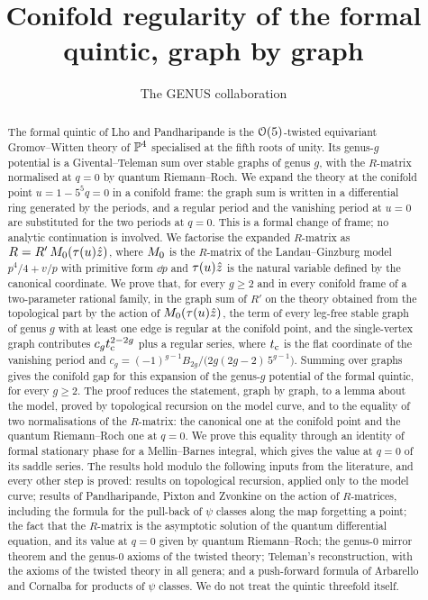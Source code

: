 \documentclass[11pt, reqno]{amsart}
\title[The formal quintic at the conifold point]{Conifold regularity of the formal quintic, graph by graph\protect\draftnote{Working title; to be settled by the authors.}}
\author{The GENUS collaboration}
\begin{document}
\begin{abstract}
The formal quintic of Lho and Pandharipande is the $\mathcal{O}(5)$-twisted equivariant Gromov--Witten theory of $\mathbb{P}^4$ specialised at the fifth roots of unity. Its genus-$g$ potential is a Givental--Teleman sum over stable graphs of genus $g$, with the $R$-matrix normalised at $q=0$ by quantum Riemann--Roch. We expand the theory at the conifold point $u=1-5^5q=0$ in a conifold frame: the graph sum is written in a differential ring generated by the periods, and a regular period and the vanishing period at $u=0$ are substituted for the two periods at $q=0$. This is a formal change of frame; no analytic continuation is involved. We factorise the expanded $R$-matrix as $R=R'\,M_{0}(\tau(u)\hat{z})$, where $M_{0}$ is the $R$-matrix of the Landau--Ginzburg model $p^4/4+v/p$ with primitive form $\dd p$ and $\tau(u)\hat{z}$ is the natural variable defined by the canonical coordinate. We prove that, for every $g\geq 2$ and in every conifold frame of a two-parameter rational family, in the graph sum of $R'$ on the theory obtained from the topological part by the action of $M_{0}(\tau(u)\hat{z})$, the term of every leg-free stable graph of genus $g$ with at least one edge is regular at the conifold point, and the single-vertex graph contributes $c_gt_{\mathrm{c}}^{2-2g}$ plus a regular series, where $t_{\mathrm{c}}$ is the flat coordinate of the vanishing period and $c_g=(-1)^{g-1}B_{2g}/\bigl(2g(2g-2)\,5^{g-1}\bigr)$. Summing over graphs gives the conifold gap for this expansion of the genus-$g$ potential of the formal quintic, for every $g\geq2$. The proof reduces the statement, graph by graph, to a lemma about the model, proved by topological recursion on the model curve, and to the equality of two normalisations of the $R$-matrix: the canonical one at the conifold point and the quantum Riemann--Roch one at $q=0$. We prove this equality through an identity of formal stationary phase for a Mellin--Barnes integral, which gives the value at $q=0$ of its saddle series. The results hold modulo the following inputs from the literature, and every other step is proved: results on topological recursion, applied only to the model curve; results of Pandharipande, Pixton and Zvonkine on the action of $R$-matrices, including the formula for the pull-back of $\psi$ classes along the map forgetting a point; the fact that the $R$-matrix is the asymptotic solution of the quantum differential equation, and its value at $q=0$ given by quantum Riemann--Roch; the genus-$0$ mirror theorem and the genus-$0$ axioms of the twisted theory; Teleman's reconstruction, with the axioms of the twisted theory in all genera; and a push-forward formula of Arbarello and Cornalba for products of $\psi$ classes. We do not treat the quintic threefold itself.
\end{abstract}
\end{document}
